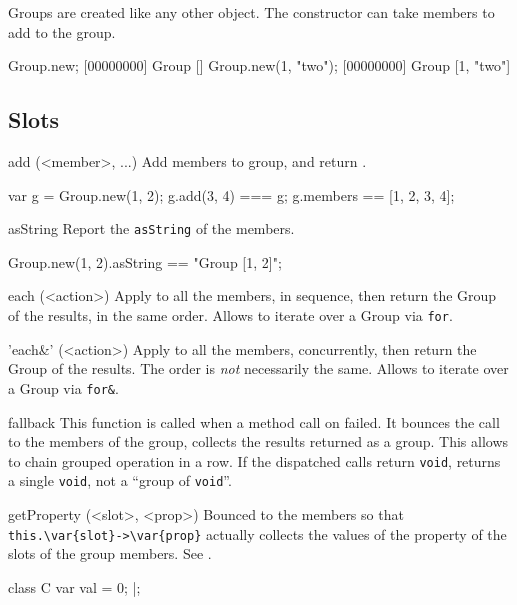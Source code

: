 Groups are created like any other object. The constructor can take members
to add to the group.

\begin{urbiscript}
Group.new;
[00000000] Group []
Group.new(1, "two");
[00000000] Group [1, "two"]
\end{urbiscript}

\subsection{Slots}

\begin{urbiscriptapi}
\item[add](<member>, ...)%
  Add members to \this group, and return \this.
\begin{urbiassert}
var g = Group.new(1, 2);
g.add(3, 4) === g;
g.members == [1, 2, 3, 4];
\end{urbiassert}

\item[asString]
  Report the \lstinline|asString| of the members.
\begin{urbiassert}
Group.new(1, 2).asString == "Group [1, 2]";
\end{urbiassert}

\item[each](<action>)%
  Apply  to all the members, in sequence, then return the
  Group of the results, in the same order.  Allows to iterate over a
  Group via \lstinline|for|.

\item['each&'](<action>)%
  Apply  to all the members, concurrently, then return the
  Group of the results.  The order is \emph{not} necessarily the same.
  Allows to iterate over a Group via \lstinline|for&|.

\item[fallback]
  This function is called when a method call on \this
  failed.  It bounces the call to the members of the group, collects
  the results returned as a group.  This allows to chain grouped
  operation in a row.  If the dispatched calls return
  \lstinline|void|, returns a single \lstinline|void|, not a ``group
  of \lstinline|void|''.

\item[getProperty](<slot>, <prop>)%
  Bounced to the members so that \lstinline|this.\var{slot}->\var{prop}|
  actually collects the values of the property  of the slots
   of the group members.  See .
\begin{urbiscript}
class C
{
  var val = 0;
}|;


\end{urbiscript}
\end{urbiscriptapi}
